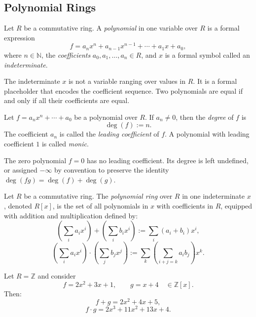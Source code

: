 \subsection*{Polynomial Rings}

\begin{definition}[Polynomial]
Let $R$ be a commutative ring.
A \emph{polynomial} in one variable over $R$ is a formal expression
\[
f = a_n x^n + a_{n-1} x^{n-1} + \cdots + a_1 x + a_0,
\]
where $n \in \mathbb{N}$, the \emph{coefficients} $a_0, a_1, \dots, a_n \in R$,
and $x$ is a formal symbol called an \emph{indeterminate}.
\end{definition}

\begin{remark}
The indeterminate $x$ is not a variable ranging over values in $R$.
It is a formal placeholder that encodes the coefficient sequence.
Two polynomials are equal if and only if all their coefficients are equal.
\end{remark}

\begin{definition}[Degree]
Let $f = a_n x^n + \cdots + a_0$ be a polynomial over $R$.
If $a_n \neq 0$, then the \emph{degree} of $f$ is
\[
\deg(f) := n.
\]
The coefficient $a_n$ is called the \emph{leading coefficient} of $f$.
A polynomial with leading coefficient $1$ is called \emph{monic}.
\end{definition}

\begin{remark}
The zero polynomial $f = 0$ has no leading coefficient.
Its degree is left undefined, or assigned $-\infty$ by convention
to preserve the identity $\deg(fg) = \deg(f) + \deg(g)$.
\end{remark}

\begin{definition}
Let $R$ be a commutative ring.
The \emph{polynomial ring} over $R$ in one indeterminate $x$,
denoted $R[x]$, is the set of all polynomials in $x$ with
coefficients in $R$, equipped with addition and multiplication
defined by:
\[
\left(\sum_{i} a_i x^i\right) + \left(\sum_{i} b_i x^i\right)
:= \sum_{i} (a_i + b_i) x^i,
\]
\[
\left(\sum_{i} a_i x^i\right) \cdot \left(\sum_{j} b_j x^j\right)
:= \sum_{k} \left(\sum_{i+j=k} a_i b_j\right) x^k.
\]
\end{definition}

\begin{example}
Let $R = \mathbb{Z}$ and consider
\[
f = 2x^2 + 3x + 1, \qquad g = x + 4 \quad \in \mathbb{Z}[x].
\]
Then:
\[
f + g = 2x^2 + 4x + 5,
\]
\[
f \cdot g = 2x^3 + 11x^2 + 13x + 4.
\]
\end{example}

